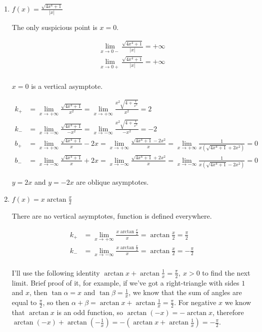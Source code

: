\documentclass{article}
\begin{document}
\begin{enumerate}
\begin{enumerate}
\item $f(x)=\frac{\sqrt{4x^4+1}}{|x|}$

The only suspicious point is $x=0$.

\begin{align*}
\lim_{x \to 0-} \frac{\sqrt{4x^4+1}}{|x|}=+\infty\\
\lim_{x \to 0+} \frac{\sqrt{4x^4+1}}{|x|}=+\infty\\
\end{align*}

$x=0$ is a vertical asymptote.

\begin{align*}
k_{+}&=\lim_{x \to +\infty} \frac{\sqrt{4x^4+1}}{x^2}=\lim_{x \to +\infty} \frac{x^2\sqrt{4+\frac{1}{x^4}}}{x^2}=2\\
k_{-}&=\lim_{x \to -\infty} \frac{\sqrt{4x^4+1}}{-x^2}=\lim_{x \to -\infty} \frac{x^2\sqrt{4+\frac{1}{x^4}}}{-x^2}=-2\\
b_{+}&=\lim_{x \to +\infty} \frac{\sqrt{4x^4+1}}{x}-2x=\lim_{x \to +\infty} \frac{\sqrt{4x^4+1}-2x^2}{x}=\lim_{x \to +\infty} \frac{1}{x(\sqrt{4x^4+1}+2x^2)}=0\\
b_{-}&=\lim_{x \to -\infty} \frac{\sqrt{4x^4+1}}{x}+2x=\lim_{x \to -\infty} \frac{\sqrt{4x^4+1}+2x^2}{x}=\lim_{x \to -\infty} \frac{1}{x(\sqrt{4x^4+1}-2x^2)}=0
\end{align*}

$y=2x$ and $y=-2x$ are oblique asymptotes.

\item $f(x)=x\arctan{\frac{x}{2}}$

There are no vertical asymptotes, function is defined everywhere.

\begin{align*}
k_{+}&=\lim_{x \to +\infty} \frac{x\arctan{\frac{x}{2}}}{x}=\arctan{\frac{x}{2}}=\frac{\pi}{2}\\
k_{-}&=\lim_{x \to -\infty} \frac{x\arctan{\frac{x}{2}}}{x}=\arctan{\frac{x}{2}}=-\frac{\pi}{2}\\
\end{align*}

I'll use the following identity $\arctan{x}+\arctan{\frac{1}{x}}=\frac{\pi}{2}, \: x > 0$ to find the next limit. Brief proof of it, for example, if we've got a right-triangle with sides $1$ and $x$, then $\tan{\alpha}=x$ and $\tan{\beta}=\frac{1}{x}$, we know that the sum of angles are equal to $\frac{\pi}{2}$, so then $\alpha+\beta=\arctan{x}+\arctan{\frac{1}{x}}=\frac{\pi}{2}$. For negative $x$ we know that $\arctan{x}$ is an odd function, so $\arctan{(-x)}=-\arctan{x}$, therefore $\arctan{(-x)}+\arctan{(-\frac{1}{x})}=-(\arctan{x}+\arctan{\frac{1}{x}})=-\frac{\pi}{2}$.


\end{enumerate}
\end{enumerate}
\end{document}
